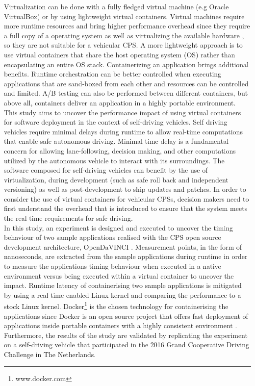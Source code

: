 Virtualization can be done with a fully fledged virtual machine (e.g Oracle VirtualBox) or by using lightweight virtual containers. Virtual machines require more runtime resources and bring higher performance overhead since they require a full copy of a operating system as well as virtualizing the available hardware \cite{anderson2015docker}, so they are not suitable for a vehicular CPS. A more lightweight approach is to use virtual containers that share the host operating system (OS) rather than encapsulating an entire OS stack. Containerizing an application brings additional benefits. Runtime orchestration can be better controlled when executing applications that are sand-boxed from each other and resources can be controlled and limited. A/B testing can also be performed between different containers, but above all, containers deliver an application in a highly portable environment.\\

This study aims to uncover the performance impact of using virtual containers for software deployment in the context of self-driving vehicles. Self driving vehicles require minimal delays during runtime to allow real-time computations that enable safe autonomous driving. Minimal time-delay is a fundamental concern for allowing lane-following, decision making, and other computations utilized by the autonomous vehicle to interact with its surroundings. The software composed for self-driving vehicles can benefit by the use of virtualization, during development (such as safe roll back and independent versioning) as well as post-development to ship updates and patches. In order to consider the use of virtual containers for vehicular CPSs, decision makers need to first understand the overhead that is introduced to ensure that the system meets the real-time requirements for safe driving.\\

In this study, an experiment is designed and executed to uncover the timing behaviour of two sample applications realised with the CPS open source development architecture, OpenDaVINCI \cite{OpenDaVINCI}. Measurement points, in the form of nanoseconds, are extracted from the sample applications during runtime in order to measure the applications timing behaviour when executed in a native environment versus being executed within a virtual container to uncover the impact. Runtime latency of containerising two sample applications is mitigated by using a real-time enabled Linux kernel and comparing the performance to a stock Linux kernel. Docker\footnote{www.docker.com} is the chosen technology for containerising the applications since Docker is an open source project that offers fast deployment of applications inside portable containers with a highly consistent environment \cite{bernstein2014containers}. Furthermore, the results of the study are validated by replicating the experiment on a self-driving vehicle that participated in the 2016 Grand Cooperative Driving Challenge in The Netherlands.

